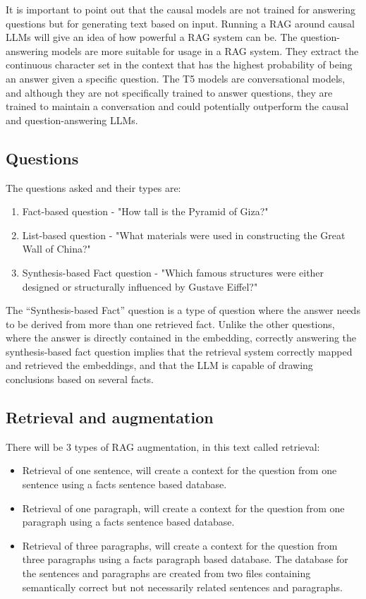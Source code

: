 \documentclass{wseas}
\begin{document}
It is important to point out that the causal models are not trained for
answering questions but for generating text based on input. Running a
RAG around causal LLMs will give an idea of how powerful a RAG system
can be. The question-answering models are more suitable for usage in a
RAG system. They extract the continuous character set in the context
that has the highest probability of being an answer given a specific
question. The T5 models are conversational models, and although they are
not specifically trained to answer questions, they are trained to
maintain a conversation and could potentially outperform the causal and
question-answering LLMs.

\subsection{Questions}

The questions asked and their types are:

\begin{enumerate}
\def\labelenumi{\arabic{enumi}.}
\item
  Fact-based question - "How tall is the Pyramid of Giza?"
\item
  List-based question - "What materials were used in constructing the
  Great Wall of China?"
\item
  Synthesis-based Fact question - "Which famous structures were either
  designed or structurally influenced by Gustave Eiffel?"
\end{enumerate}

The ``Synthesis-based Fact'' question is a type of question where the
answer needs to be derived from more than one retrieved fact. Unlike the
other questions, where the answer is directly contained in the
embedding, correctly answering the synthesis-based fact question implies
that the retrieval system correctly mapped and retrieved the embeddings,
and that the LLM is capable of drawing conclusions based on several
facts.


\subsection{Retrieval and
augmentation}

There will be 3 types of RAG augmentation, in this text called
retrieval:

\begin{itemize}
\item
  Retrieval of one sentence, will create a context for the question from
  one sentence using a facts sentence based database.
\item
  Retrieval of one paragraph, will create a context for the question
  from one paragraph using a facts sentence based database.
\item
  Retrieval of three paragraphs, will create a context for the question
  from three paragraphs using a facts paragraph based database. The
  database for the sentences and paragraphs are created from two files
  containing semantically correct but not necessarily related sentences
  and paragraphs.
\end{itemize}
\end{document}
